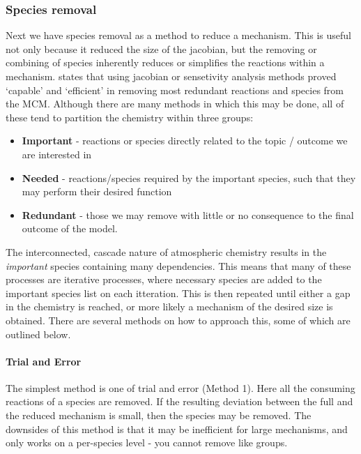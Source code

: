 \subsubsection{Species removal}
Next we have species removal as a method to reduce a mechanism. This is useful not only because it reduced the size of the jacobian, but the removing or combining of species inherently reduces or simplifies the reactions within a mechanism. \cite{whitehouse1} states that using jacobian or sensetivity analysis methods proved `capable' and `efficient' in removing most redundant reactions and species from the MCM. Although there are many methods in which this may be done, all of these tend to partition the chemistry within three groups:


\begin{itemize}
    \item \textbf{Important} - reactions or species directly related to the topic / outcome we are interested in
    \item \textbf{Needed} - reactions/species required by the important species, such that they may perform their desired function
    \item \textbf{Redundant} - those we may remove with little or no consequence to the final outcome of the model. 
\end{itemize}



The interconnected, cascade nature of atmospheric chemistry results in the \emph{important} species containing many dependencies. This means that many of these processes are iterative processes, where necessary species are added to the important species list on each itteration. This is then repeated until either a gap in the chemistry is reached, or more likely a mechanism of the desired size is obtained. There are several methods on how to approach this, some of which are outlined below. 

\paragraph*{Trial and Error}
The simplest method is one of trial and error \cite{tur1990} (Method 1). Here all the consuming reactions of a species are removed. If the resulting deviation between the full and the reduced mechanism is small, then the species may be removed. The downsides of this method is that it may be inefficient for large mechanisms, and only works on a per-species level - you cannot remove like groups. 

